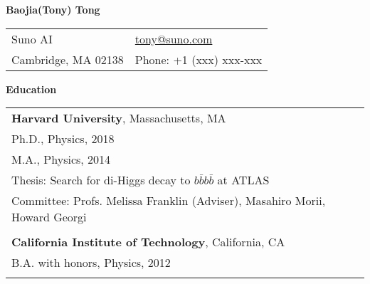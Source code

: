 \documentclass[letterpaper,11pt,oneside]{article}
\newcommand*{\Skype}{\href{skype:baojia.tong?add}{baojia.tong}}
\newcommand{\Absender}[1][\normalsize]{\Skype}
\newcommand{\blue}[1]{\textcolor[rgb]{0,0,0.9}{#1}}
\begin{document}

\noindent  \center \LARGE{\textbf{Baojia(Tony) Tong}}  \\
\vspace{1cm}
\normalsize
\begin{center}
\begin{tabular}{l l}
Suno AI           & \hspace{1in} \href{mailto:tony@suno.com}{tony@suno.com} \\
 Cambridge, MA 02138     & \hspace{1in} Phone: +1 (xxx) xxx-xxx \\
\end{tabular}
\end{center}
\noindent\makebox[\linewidth]{\rule{0.8\paperwidth}{1.5pt}}
\raggedright
\normalsize
\begin{flushleft}
\textbf{\Large{Education}} \\
\vspace{0.5cm}
 \begin{tabular}{@{} l}
     \textbf{Harvard University}, Massachusetts, MA \\
     Ph.D., Physics, 2018 \\
     M.A., Physics, 2014 \\
     Thesis: Search for di-Higgs decay to $b\bar{b}b\bar{b}$ at ATLAS \\
     Committee: Profs. Melissa Franklin (Adviser), Masahiro Morii, Howard Georgi \\
     \\
     \textbf{California Institute of Technology}, California, CA \\
     B.A. with honors, Physics, 2012 \\
     \\
 \end{tabular}
\end{flushleft}
\end{document}
